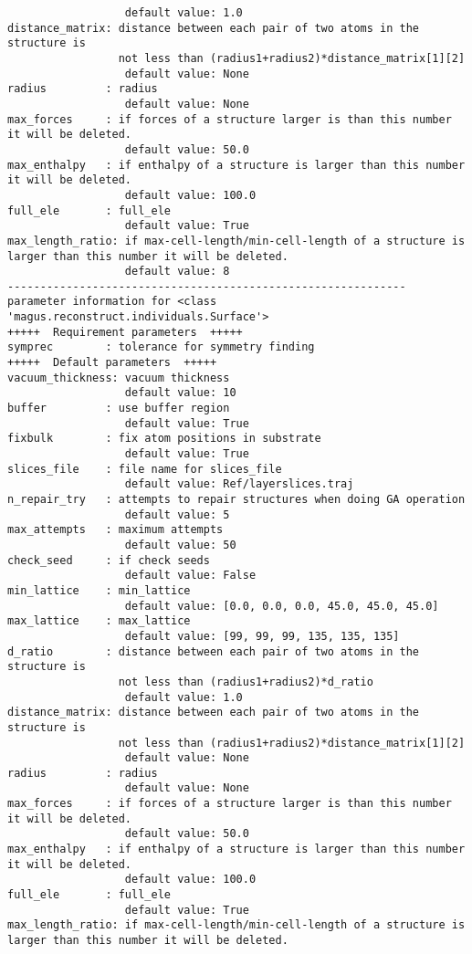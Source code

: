 \documentclass[12pt,oneside]{book}
\begin{document}
\begin{tcolorbox}
\begin{verbatim}
                  default value: 1.0
distance_matrix: distance between each pair of two atoms in the structure is
                 not less than (radius1+radius2)*distance_matrix[1][2]
                  default value: None
radius         : radius
                  default value: None
max_forces     : if forces of a structure larger is than this number it will be deleted.
                  default value: 50.0
max_enthalpy   : if enthalpy of a structure is larger than this number it will be deleted.
                  default value: 100.0
full_ele       : full_ele
                  default value: True
max_length_ratio: if max-cell-length/min-cell-length of a structure is larger than this number it will be deleted.
                  default value: 8
-------------------------------------------------------------
parameter information for <class 'magus.reconstruct.individuals.Surface'>
+++++  Requirement parameters  +++++
symprec        : tolerance for symmetry finding
+++++  Default parameters  +++++
vacuum_thickness: vacuum thickness
                  default value: 10
buffer         : use buffer region
                  default value: True
fixbulk        : fix atom positions in substrate
                  default value: True
slices_file    : file name for slices_file
                  default value: Ref/layerslices.traj
n_repair_try   : attempts to repair structures when doing GA operation
                  default value: 5
max_attempts   : maximum attempts
                  default value: 50
check_seed     : if check seeds
                  default value: False
min_lattice    : min_lattice
                  default value: [0.0, 0.0, 0.0, 45.0, 45.0, 45.0]
max_lattice    : max_lattice
                  default value: [99, 99, 99, 135, 135, 135]
d_ratio        : distance between each pair of two atoms in the structure is
                 not less than (radius1+radius2)*d_ratio
                  default value: 1.0
distance_matrix: distance between each pair of two atoms in the structure is
                 not less than (radius1+radius2)*distance_matrix[1][2]
                  default value: None
radius         : radius
                  default value: None
max_forces     : if forces of a structure larger is than this number it will be deleted.
                  default value: 50.0
max_enthalpy   : if enthalpy of a structure is larger than this number it will be deleted.
                  default value: 100.0
full_ele       : full_ele
                  default value: True
max_length_ratio: if max-cell-length/min-cell-length of a structure is larger than this number it will be deleted.

\end{verbatim}
\end{tcolorbox}
\end{document}
